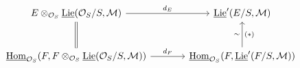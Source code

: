 \[\begin{tikzcd}[column sep=large,row sep=large]
E\otimes_{\mathcal O_S}\underline{\operatorname{Lie}}(\mathcal O_S/S,\mathcal M) \arrow[r,"d_E"] \arrow[d,equal] & \underline{\operatorname{Lie}}'(E/S,\mathcal M)\\
\underline{\operatorname{Hom}}_{\mathcal O_S}(F,F\otimes_{\mathcal O_S}\underline{\operatorname{Lie}}(\mathcal O_S/S,\mathcal M)) \arrow[r,"d_F"] & \underline{\operatorname{Hom}}_{\mathcal O_S}(F,\underline{\operatorname{Lie}}'(F/S,\mathcal M)) \arrow[u,"\sim" left,"(*)" right]
\end{tikzcd}\]
